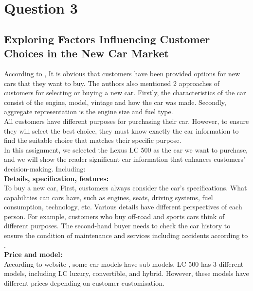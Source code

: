 \documentclass[12pt,a4paper]{article}
\begin{document}
\pagebreak

\setcounter{page}{3}

\section{Question 3}
\subsection{Exploring Factors Influencing Customer Choices in the New Car Market}
\label{sec:Question 3}

\noindent According to \cite{Ref3.1}, It is obvious that customers have been provided options for new cars that they want to buy. The authors also mentioned 2 approaches of customers for selecting or buying a new car. Firstly, the characteristics of the car consist of the engine, model, vintage and how the car was made. Secondly, aggregate representation is the engine size and fuel type.\\

\noindent All customers have different purposes for purchasing their car. However, to ensure they will select the best choice, they must know exactly the car information to find the suitable choice that matches their specific purpose. \\ 

\noindent In this assignment, we selected the Lexus LC 500 as the car we want to purchase, and we will show the reader significant car information that enhances customers' decision-making. Including: \\

\noindent\textbf{Details, specification, features: }\\
\noindent To buy a new car, First, customers always consider the car's specifications. What capabilities can cars have, such as engines, seats, driving systems, fuel consumption, technology, etc. Various details have different perspectives of each person. For example, customers who buy off-road and sports cars think of different purposes. The second-hand buyer needs to check the car history to ensure the condition of maintenance and services including accidents according to \cite{Ref3.3}.\\ 

\noindent\textbf{Price and model: }\\
\noindent According to website \cite{Ref3.2}, some car models have sub-models. LC 500 has 3 different models, including LC luxury, convertible, and hybrid. However, these models have different prices depending on customer customisation.\\
\end{document}
